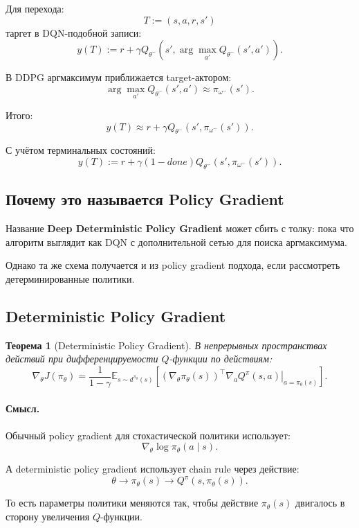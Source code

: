 \documentclass[12pt,a4paper]{article}
\newtheorem{theorem}{Теорема}
\begin{document}
Для перехода:
\[
T:=(s,a,r,s')
\]
таргет в DQN-подобной записи:
\[
y(T)
:=
r
+
\gamma
Q_{\theta^-}
\left(
s',
\arg\max_{a'}Q_{\theta^-}(s',a')
\right).
\]

В DDPG аргмаксимум приближается target-актором:
\[
\arg\max_{a'}Q_{\theta^-}(s',a')
\approx
\pi_{\omega^-}(s').
\]

Итого:
\[
y(T)
\approx
r
+
\gamma
Q_{\theta^-}
\left(
s',
\pi_{\omega^-}(s')
\right).
\]

С учётом терминальных состояний:
\[
y(T)
:=
r
+
\gamma(1-done)
Q_{\theta^-}
\left(
s',
\pi_{\omega^-}(s')
\right).
\]

\subsection{Почему это называется Policy Gradient}

Название \textbf{Deep Deterministic Policy Gradient} может сбить с толку: пока что алгоритм выглядит как DQN с дополнительной сетью для поиска аргмаксимума.

Однако та же схема получается и из policy gradient подхода, если рассмотреть детерминированные политики.

\subsection{Deterministic Policy Gradient}

\begin{theorem}[Deterministic Policy Gradient]
В непрерывных пространствах действий при дифференцируемости $Q$-функции по действиям:
\[
\nabla_\theta J(\pi_\theta)
=
\frac{1}{1-\gamma}
\mathbb E_{s\sim d^{\pi_\theta}(s)}
\left[
\left(
\nabla_\theta \pi_\theta(s)
\right)^\top
\left.
\nabla_a Q^\pi(s,a)
\right|_{a=\pi_\theta(s)}
\right].
\]
\end{theorem}

\paragraph{Смысл.}

Обычный policy gradient для стохастической политики использует:
\[
\nabla_\theta \log \pi_\theta(a\mid s).
\]

А deterministic policy gradient использует chain rule через действие:
\[
\theta
\longrightarrow
\pi_\theta(s)
\longrightarrow
Q^\pi(s,\pi_\theta(s)).
\]

То есть параметры политики меняются так, чтобы действие $\pi_\theta(s)$ двигалось в сторону увеличения $Q$-функции.
\end{document}
